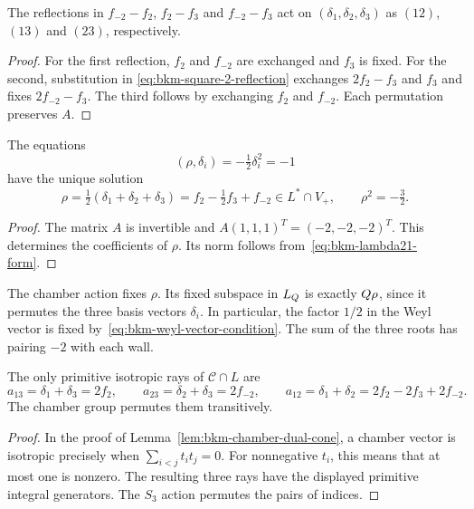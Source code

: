 \begin{lemma}
\label{lem:bkm-chamber-s3}
The reflections in $f_{-2}-f_2$, $f_2-f_3$ and $f_{-2}-f_3$
act on $(\delta_1,\delta_2,\delta_3)$ as $(12)$, $(13)$ and $(23)$,
respectively.
\end{lemma}
\begin{proof}
For the first reflection, $f_2$ and $f_{-2}$ are exchanged and
$f_3$ is fixed. For the second, substitution in
\eqref{eq:bkm-square-2-reflection} exchanges $2f_2-f_3$ and $f_3$
and fixes $2f_{-2}-f_3$. The third follows by exchanging $f_2$
and $f_{-2}$. Each permutation preserves $A$.
\end{proof}

\begin{proposition}
\label{prop:bkm-weyl-vector}
The equations
\begin{equation}
\label{eq:bkm-weyl-vector-condition}
 (\rho,\delta_i)=-\tfrac12\delta_i^2=-1
\end{equation}
have the unique solution
\begin{equation}
\label{eq:bkm-weyl-vector}
 \rho=\tfrac12(\delta_1+\delta_2+\delta_3)
 =f_2-\tfrac12f_3+f_{-2}\in L^*\cap V_+,
 \qquad \rho^2=-\tfrac32.
\end{equation}
\end{proposition}
\begin{proof}
The matrix $A$ is invertible and
$A(1,1,1)^T=(-2,-2,-2)^T$. This determines the coefficients of
$\rho$. Its norm follows from~\eqref{eq:bkm-lambda21-form}.
\end{proof}

\begin{remark}
\label{rem:bkm-rho-s3-invariant}
The chamber action fixes $\rho$. Its fixed subspace in $L_{Q}$ is
exactly $Q\rho$, since it permutes the three basis vectors
$\delta_i$. In particular, the factor $1/2$ in the Weyl vector is
fixed by~\eqref{eq:bkm-weyl-vector-condition}. The sum of the three
roots has pairing $-2$ with each wall.
\end{remark}

\begin{lemma}
\label{lem:bkm-isotropic-orbit}
The only primitive isotropic rays of $\mathcal C\cap L$ are
\[
 a_{13}=\delta_1+\delta_3=2f_2,\qquad
 a_{23}=\delta_2+\delta_3=2f_{-2},\qquad
 a_{12}=\delta_1+\delta_2=2f_2-2f_3+2f_{-2}.
\]
The chamber group permutes them transitively.
\end{lemma}
\begin{proof}
In the proof of Lemma~\ref{lem:bkm-chamber-dual-cone}, a chamber
vector is isotropic precisely when $\sum_{i<j}t_it_j=0$.
For nonnegative $t_i$, this means that at most one is nonzero.
The resulting three rays have the displayed primitive integral
generators. The $S_3$ action permutes the pairs of indices.
\end{proof}

